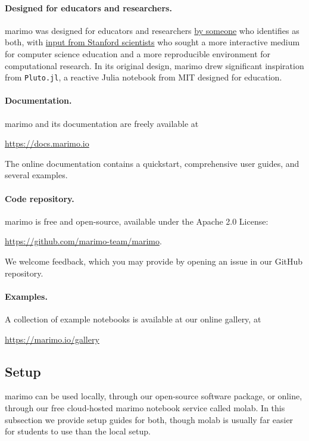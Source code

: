 \documentclass{article}
\begin{document}
\paragraph{Designed for educators and researchers.} marimo was designed for
educators and researchers \href{https://www.akshayagrawal.com}{by someone} who identifies as both, with \href{
  https://marimo.io/blog/slac-marimo}{input from Stanford scientists} who
sought a more interactive medium for computer science education and a more
reproducible environment for computational research. In its original design,
marimo drew significant inspiration from \texttt{Pluto.jl}, a reactive Julia
notebook from MIT designed for education.

\paragraph{Documentation.} marimo and its documentation are freely available at
\begin{center}
\url{https://docs.marimo.io}
\end{center}
The online documentation contains a quickstart, comprehensive user guides, and
several examples.

\paragraph{Code repository.} marimo is free and open-source, available under
the Apache 2.0 License:
\begin{center}
  \url{https://github.com/marimo-team/marimo}.
\end{center}
We welcome feedback, which you may provide by opening an issue in our GitHub
repository.

\paragraph{Examples.} A collection of example notebooks is available at our online gallery,
at
\begin{center}
  \url{https://marimo.io/gallery}
\end{center}

\subsection{Setup}

marimo can be used locally, through our open-source software package, or online,
through our free cloud-hosted marimo notebook service called molab. In this subsection
we provide setup guides for both, though molab is usually
far easier for students to use than the local setup.
\end{document}

